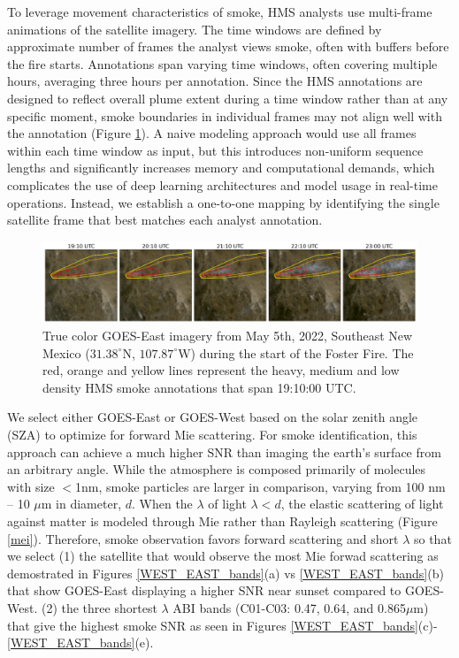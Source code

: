 \documentclass{article}
\begin{document}
To leverage movement characteristics of smoke, HMS analysts use multi-frame animations of the satellite imagery. The time windows are defined by  approximate number of frames the analyst views smoke, often with buffers before the fire starts. Annotations span varying time windows, often covering multiple hours, averaging three hours per annotation. Since the HMS annotations are designed to reflect overall plume extent during a time window rather than at any specific moment, smoke boundaries in individual frames may not align well with the annotation (Figure \ref{timelapse}). A naive modeling approach would use all frames within each time window as input, but this introduces non-uniform sequence lengths and significantly increases memory and computational demands, which complicates the use of deep learning architectures and model usage in real-time operations. Instead, we establish a one-to-one mapping by identifying the single satellite frame that best matches each analyst annotation.

\begin{figure}[!htb]
    \centering
    \includegraphics[width=\linewidth]{figures/timelapse_small.png}
    \caption{True color GOES-East imagery from May 5th, 2022, Southeast New Mexico (\(31.38^{\circ}\)N, \(107.87^{\circ}\)W) during the start of the Foster Fire. The red, orange and yellow lines represent the heavy, medium and low density HMS smoke annotations that span 19:10:00 UTC.}
    \label{timelapse}
\end{figure}


We select either GOES-East or GOES-West based on the solar zenith angle (SZA) to optimize for forward Mie scattering. For smoke identification, this approach can achieve a much higher SNR than imaging the earth’s surface from an arbitrary angle. While the atmosphere is composed primarily of molecules with size \(<\)1nm, smoke particles are larger in comparison, varying from 100 nm -- 10 \(\mu\)m in diameter, \(d\). When the \(\lambda\) of light \(\lambda<d\), the elastic scattering of light against matter is modeled through Mie rather than Rayleigh scattering (Figure \ref{mei}). Therefore, smoke observation favors forward scattering and short \(\lambda\) so that we select (1) the satellite that would observe the most Mie forwad scattering as demostrated in Figures \ref{WEST_EAST_bands}(a) vs \ref{WEST_EAST_bands}(b) that show GOES-East displaying a higher SNR near sunset compared to GOES-West. (2) the three shortest \(\lambda\) ABI bands (C01-C03: 0.47, 0.64, and 0.865\(\mu\)m) that give the highest smoke SNR as seen in Figures \ref{WEST_EAST_bands}(c)-\ref{WEST_EAST_bands}(e).
\end{document}
